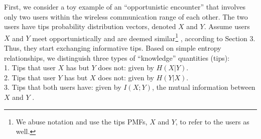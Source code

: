 \documentclass[12pt,epsf]{article}
\theoremstyle{definition}
\begin{document}
First, we consider a toy example of an ``opportunistic encounter'' that involves only two users within the wireless communication range of each other. The two users have tips probability distribution vectors, denoted $X$ and $Y$. Assume users $X$ and $Y$ meet opportunistically and are deemed similar\footnote{We abuse notation and use the tips PMFs, $X$ and $Y$, to refer to the users as well.} , according to Section 3. Thus, they start exchanging informative tips. Based on simple entropy relationships,
we distinguish three types of ``knowledge'' quantities (tips):\\ 
%
1. Tips that user $X$ has but $Y$ does not: given  by $H(X|Y)$.\\
2. Tips that user $Y$ has but $X$ does not: given by $H(Y|X)$.\\
3. Tips that both users have: given by $I(X;Y)$, the mutual information between $X$ and $Y$ .
\end{document}
